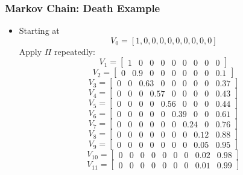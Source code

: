 \documentclass{beamer}
\begin{document}
\begin{frame}
\frametitle[alignment=center]{Markov Chain: Death Example}
\begin{itemize}
\item Starting at $$V_0=[1,0,0,0,0,0,0,0,0,0]$$
Apply $\Pi$ repeatedly:
 $$V_1=  [\begin{array}{ccccccccc}1  &  0  &  0  &  0  &  0  &  0  &  0  &  0  &  0 \end{array}]$$
 $$V_2=  [ \begin{array}{ccccccccc}  0 &    0.9  &  0  &  0  &  0  &  0  &  0  &  0 &    0.1\end{array}]$$
 $$V_3=  [\begin{array}{ccccccccc}  0  &  0 &   0.63  &  0  &  0  &  0  &  0  &  0 &   0.37\end{array}]$$
   $$V_4=[\begin{array}{ccccccccc}    0  &  0  &  0 &  0.57  &  0  &  0  &  0  &  0 &  0.43\end{array}]$$
   $$V_5=[\begin{array}{ccccccccc}    0  &  0  &  0  &  0 & 0.56  &  0  &  0  &  0 & 0.44\end{array}]$$
   $$V_6=[\begin{array}{ccccccccc}    0  &  0  &  0  &  0  &  0   &   0.39  &  0  &  0 & 0.61\end{array}]$$
   $$V_7=[\begin{array}{ccccccccc}    0  &  0  &  0  &  0  &  0  &  0   &   0.24  &  0 & 0.76\end{array}]$$
   $$V_8=[ \begin{array}{ccccccccc}   0  &  0  &  0  &  0  &  0  &  0  &  0 & 0.12 & 0.88\end{array}]$$
   $$V_9= [\begin{array}{ccccccccc}   0  &  0  &  0  &  0  &  0  &  0  &  0 & 0.05 & 0.95\end{array}]$$
   $$V_{10}=[ \begin{array}{ccccccccc}   0  &  0  &  0  &  0  &  0  &  0  &  0 & 0.02 & 0.98\end{array}]$$
   $$V_{11}=[ \begin{array}{ccccccccc}   0  &  0  &  0  &  0  &  0  &  0  &  0 & 0.01 & 0.99\end{array}]$$
\end{itemize}
\end{frame}
\end{document}
